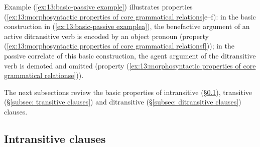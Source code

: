 Example (\ref{ex:13:basic-passive example}) illustrates properties (\ref{ex:13:morphosyntactic properties of core grammatical relations}e--f): in the basic construction in (\ref{ex:13:basic-passive examplea}), the benefactive argument of an active ditransitive verb is encoded by an object pronoun (property (\ref{ex:13:morphosyntactic properties of core grammatical relationsf})); in the passive correlate of this basic construction, the agent argument of the ditransitive verb is demoted and omitted (property (\ref{ex:13:morphosyntactic properties of core grammatical relationse})).


\largerpage
\ea\label{ex:13:basic-passive example}

    \label{ex:13:basic-passive examplea}
        \label{ex:13:basic-passive exampleb}
    \z
\z

The next subsections review the basic properties of intransitive (§\ref{subsec: intransitive clauses}), transitive (§\ref{subsec: transitive clauses}) and ditransitive (§\ref{subsec: ditransitive clauses}) clauses.

\subsection{Intransitive clauses}
\label{subsec: intransitive clauses}

